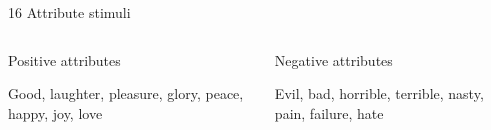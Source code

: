 \documentclass[compress]{beamer}
\begin{document}
\begin{frame}
\begin{block}{16 Attribute stimuli}
	\begin{columns}[T]
	\begin{column}{.50\linewidth}
		\begin{center}
			\color{rasch}Positive attributes
		\end{center}
		
		Good, laughter, pleasure, glory, peace, happy, joy, love
	\end{column}
	
	\begin{column}{.50\linewidth}
		\begin{center}
			\color{alert}Negative attributes
		\end{center}
		
		Evil, bad, horrible, terrible, nasty, pain, failure, hate
	\end{column}
\end{columns}
	\end{block}


\end{frame}
\end{document}
